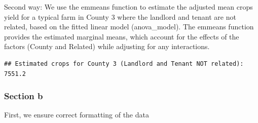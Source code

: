 \documentclass[
  11pt,
]{article}
\newenvironment{Shaded}{\begin{snugshade}}{\end{snugshade}}
\newcommand{\FunctionTok}[1]{\textcolor[rgb]{0.13,0.29,0.53}{\textbf{#1}}}
\newcommand{\NormalTok}[1]{#1}
\newcommand{\OtherTok}[1]{\textcolor[rgb]{0.56,0.35,0.01}{#1}}
\newcommand{\SpecialCharTok}[1]{\textcolor[rgb]{0.81,0.36,0.00}{\textbf{#1}}}
\newcommand{\StringTok}[1]{\textcolor[rgb]{0.31,0.60,0.02}{#1}}
\begin{document}
Second way: We use the emmeans function to estimate the adjusted mean
crops yield for a typical farm in County 3 where the landlord and tenant
are not related, based on the fitted linear model (anova\_model). The
emmeans function provides the estimated marginal means, which account
for the effects of the factors (County and Related) while adjusting for
any interactions.

\begin{Shaded}
\end{Shaded}

\begin{verbatim}
## Estimated crops for County 3 (Landlord and Tenant NOT related): 7551.2
\end{verbatim}

\subsubsection{Section b}\label{section-b-1}

First, we ensure correct formatting of the data

\begin{Shaded}
\end{Shaded}
\end{document}
